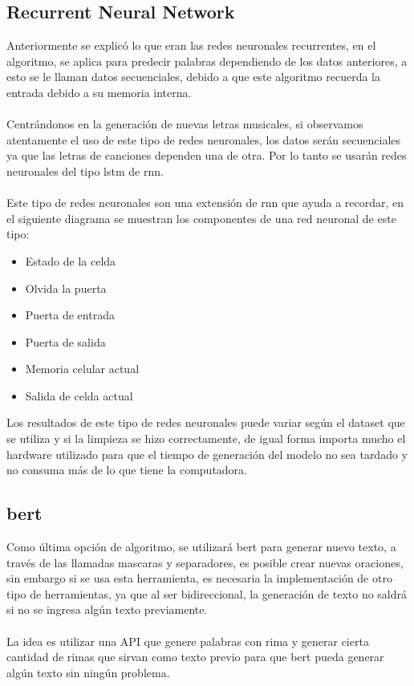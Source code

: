 \documentclass[12pt, a4paper, titlepage]{report}
\begin{document}
	   	\subsection{Recurrent Neural Network}
	   	Anteriormente se explicó lo que eran las redes neuronales recurrentes, en el algoritmo, se aplica para predecir palabras dependiendo de los datos anteriores, a esto se le llaman datos secuenciales, debido a que este algoritmo recuerda la entrada debido a su memoria interna.\\\\
	   	Centrándonos en la generación de nuevas letras musicales, si observamos atentamente el uso de este tipo de redes neuronales, los datos serán secuenciales ya que las letras de canciones dependen una de otra. Por lo tanto se usarán redes neuronales del tipo \acrfull{lstm} de  \acrfull{rnn}.\\\\
	   	Este tipo de redes neuronales son una extensión de  \acrfull{rnn} que ayuda a recordar, en el siguiente diagrama se muestran los componentes de una red neuronal de este tipo:
	   	\begin{itemize}
	   	\item Estado de la celda
	   	\item Olvida la puerta
	   	\item Puerta de entrada
	   	\item Puerta de salida
	   	\item Memoria celular actual
	   	\item Salida de celda actual
	   	\end{itemize}
   		Los resultados de este tipo de redes neuronales puede variar según el dataset que se utiliza y si la limpieza se hizo correctamente, de igual forma importa mucho el hardware utilizado para que el tiempo de generación del modelo no sea tardado y no consuma más de lo que tiene la computadora.
   		\subsection{\acrshort{bert}}
   		Como última opción de algoritmo, se utilizará \acrshort{bert} para generar nuevo texto, a través de las llamadas mascaras y separadores, es posible crear nuevas oraciones, sin embargo si se usa esta herramienta, es necesaria la implementación de otro tipo de herramientas, ya que al ser bidireccional, la generación de texto no saldrá si no se ingresa algún texto previamente.\\\\
   		La idea es utilizar una API que genere palabras con rima y generar cierta cantidad de rimas que sirvan como texto previo para que \acrshort{bert} pueda generar algún texto sin ningún problema.
   		 
\end{document}
